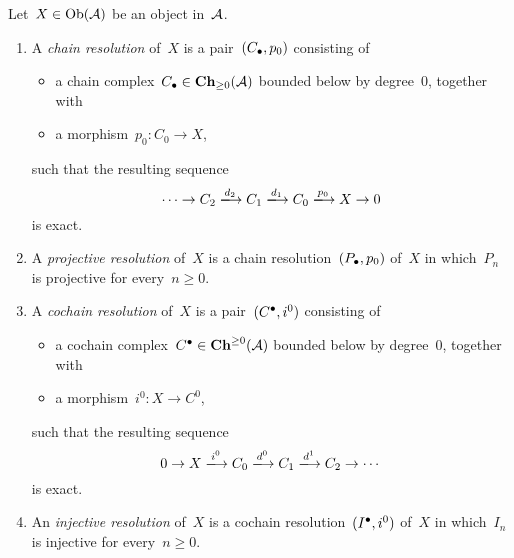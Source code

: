 \begin{definition}
  Let~$X \in \operatorname{Ob}(\mathcal{A})$ be an object in~$\mathcal{A}$.
  \begin{enumerate}
    \item
      A \emph{chain resolution} of~$X$ is a pair~$(C_\bullet, p_0)$ consisting of
      \begin{itemize}
        \item
          a chain complex~$C_\bullet \in \mathbf{Ch}_{\geq 0}(\mathcal{A})$ bounded below by degree~$0$, together with
        \item
          a morphism~$p_0 \colon C_0 \to X$,
      \end{itemize}
      such that the resulting sequence
      \[
        \dotsb
        \to
        C_2
        \xlongto{d_2}
        C_1
        \xlongto{d_1}
        C_0
        \xlongto{p_0}
        X
        \to
        0
      \]
      is exact.
    \item
      A \emph{projective resolution} of~$X$ is a chain resolution~$(P_\bullet, p_0)$ of~$X$ in which~$P_n$ is projective for every~$n \geq 0$.
    \item
      A \emph{cochain resolution} of~$X$ is a pair~$(C^\bullet, i^0)$ consisting of
      \begin{itemize}
        \item
          a cochain complex~$C^\bullet \in \mathbf{Ch}^{\geq 0}(\mathcal{A})$ bounded below by degree~$0$, together with
        \item
          a morphism~$i^0 \colon X \to C^0$,
      \end{itemize}
      such that the resulting sequence
      \[
        0
        \to
        X
        \xlongto{i^0}
        C_0
        \xlongto{d^0}
        C_1
        \xlongto{d^1}
        C_2
        \to
        \dotsb
      \]
      is exact.
    \item
      An \emph{injective resolution} of~$X$ is a cochain resolution~$(I^\bullet, i^0)$ of~$X$ in which~$I_n$ is injective for every~$n \geq 0$.
  \end{enumerate}
\end{definition}


